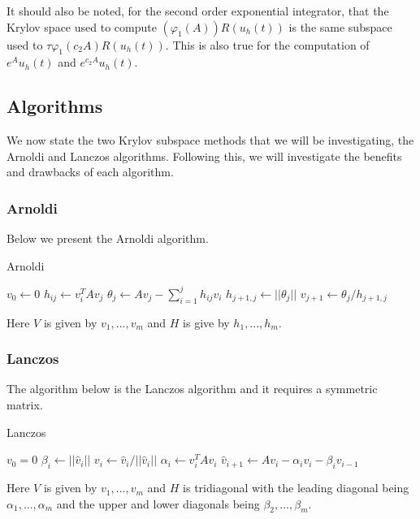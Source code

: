 It should also be noted, for the second order exponential integrator, that the Krylov space used to compute $(\varphi_1(A))R(u_h(t))$ is the same subspace used to $\tau\varphi_1(c_2 A)R(u_h(t))$.
This is also true for the computation of $e^{A}u_h(t)$ and $e^{c_2A}u_h(t)$.

\subsection{Algorithms}
We now state the two Krylov subspace methods that we will be investigating, the Arnoldi and Lanczos algorithms.
Following this, we will investigate the benefits and drawbacks of each algorithm.

\subsubsection{Arnoldi}
Below we present the Arnoldi algorithm.
\begin{algorithm}[H]
\caption{Arnoldi \cite{Higham2008}} %
\begin{algorithmic}
\State $v_0 \gets 0$
\State$h_{ij} \gets v_i^T A v_j$
\EndFor
\State$\theta_j \gets Av_j - \sum^j_{i=1} h_{ij}v_i$
\State$h_{j+1,j} \gets ||\theta_j||$
\State$v_{j+1} \gets \theta_j/h_{j+1,j}$
\EndFor
\EndProcedure
\end{algorithmic}
\end{algorithm}
Here $V$ is given by $v_1,...,v_m$ and $H$ is give by $h_1,...,h_m$.\\

\subsubsection{Lanczos}
The algorithm below is the Lanczos algorithm and it requires a symmetric matrix. \cite{Moler2003}
\begin{algorithm}[H]
\caption{Lanczos\cite{OJALVO1970}}
\begin{algorithmic}
\State $v_0 = 0$
\State$\beta_i \gets || \hat v_i ||$
\State$v_i \gets \hat v_i / || \hat v_i ||$
\State$\alpha_i \gets v_i^T A v_i$
\State$\hat v_{i+1} \gets Av_i - \alpha_iv_i - \beta_iv_{i-1}$
\EndFor
\EndProcedure
\end{algorithmic}
\end{algorithm}
Here $V$ is given by ${v_1,...,v_m}$ and $H$ is tridiagonal with the leading diagonal being $\alpha_1, ..., \alpha_m$ and the upper and lower diagonals being $\beta_2,...,\beta_m$.

